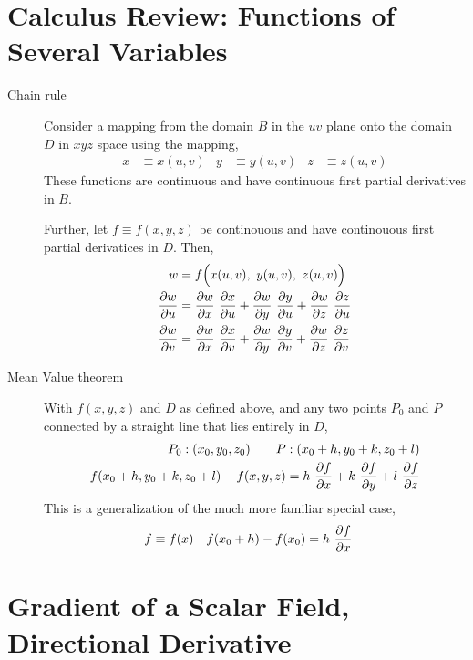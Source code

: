 \section{Calculus Review: Functions of Several Variables}

\begin{description}
    \item[Chain rule] Consider a mapping from the domain $ B $ in the $ uv $ plane
        onto the domain $ D $ in $ xyz $ space using the mapping,
        \begin{align}
            x & \equiv x(u, v) & y & \equiv y(u, v) & z & \equiv z(u, v)
        \end{align}
        These functions are continuous and have continuous first partial derivatives in
        $ B $. \par
        Further, let $ f \equiv f(x, y, z) $ be continouous and have continouous first
        partial derivatices in $ D $. Then,
        \begin{align}
            w         & = f\Big( x(u, v),\ y(u, v),\ z(u, v) \Big)    \\
            \diffp wu & = \diffp wx\ \diffp xu + \diffp wy\ \diffp yu
            + \diffp wz\ \diffp zu                                    \\
            \diffp wv & = \diffp wx\ \diffp xv + \diffp wy\ \diffp yv
            + \diffp wz\ \diffp zv
        \end{align}

    \item[Mean Value theorem] With $ f(x, y, z) $ and $ D $ as defined above, and any
        two points $ P_0 $ and $ P $ connected by a straight line that lies entirely in
        $ D $,
        \begin{align}
            P_0 : (x_0, y_0, z_0)  \qquad
            P                                         & : (x_0 + h, y_0 + k, z_0 + l) \\
            f(x_0 + h, y_0 + k, z_0 + l) - f(x, y, z) & = h\ \diffp fx + k\ \diffp fy
            + l\ \diffp fz
        \end{align}
        This is a generalization of the much more familiar special case,
        \begin{align}
            f & \equiv f(x) & f(x_0 + h) - f(x_0) & = h\ \diffp fx
        \end{align}
\end{description}

\section{Gradient of a Scalar Field, Directional Derivative}


